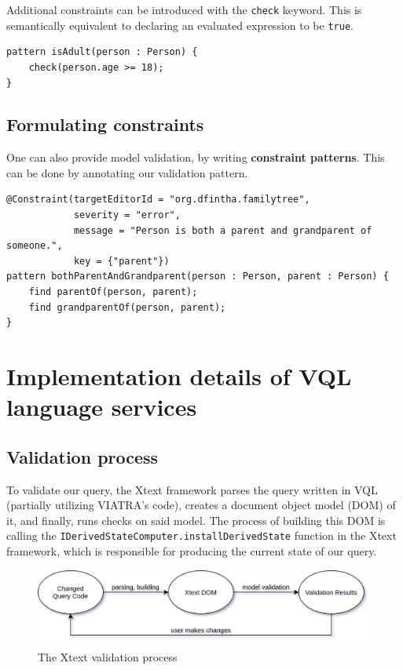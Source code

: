 \documentclass[11pt,a4paper,oneside]{report}
\begin{document}
Additional constraints can be introduced with the \texttt{check} keyword. This
is semantically equivalent to declaring an evaluated expression to be
\texttt{true}.

\begin{lstlisting}[caption={A simple constraint, checking if a \texttt{Person} is an adult}, frame=single]
pattern isAdult(person : Person) {
    check(person.age >= 18);
}
\end{lstlisting}

\subsection{Formulating constraints}
One can also provide model validation, by writing \textbf{constraint patterns}.
This can be done by annotating our validation pattern.

\begin{lstlisting}[caption={Validation constraint, emitting an error message if two \texttt{Person} entities have both parent-child and grandparent-grandchild relations}, frame=single]
@Constraint(targetEditorId = "org.dfintha.familytree",
            severity = "error",
            message = "Person is both a parent and grandparent of someone.",
            key = {"parent"})
pattern bothParentAndGrandparent(person : Person, parent : Person) {
    find parentOf(person, parent);
    find grandparentOf(person, parent);
}
\end{lstlisting}

\section{Implementation details of VQL language services}

\subsection{Validation process}
To validate our query, the Xtext framework parses the query written in VQL
(partially utilizing VIATRA's code), creates a document object model (DOM) of
it, and finally, runs checks on said model. The process of building this DOM is
calling the \texttt{IDerivedStateComputer.installDerivedState} function in the
Xtext framework, which is responsible for producing the current state of our
query.

\begin{figure}[ht]
\centering
\includegraphics[width=150mm, keepaspectratio]{figures/xtext-validation-process.png}
\caption{The Xtext validation process}
\label{fig:xtext-validation-process}
\end{figure}
\end{document}

